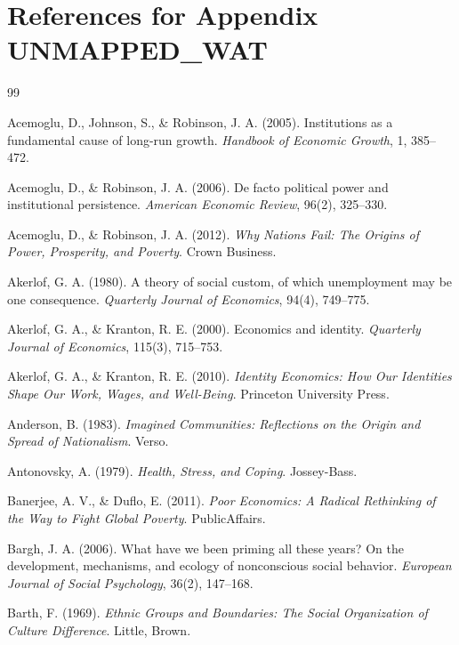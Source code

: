 \section{References for Appendix UNMAPPED_WAT}
\label{sec:app-c-references}

\begin{thebibliography}{99}

Acemoglu, D., Johnson, S., \& Robinson, J. A. (2005).
Institutions as a fundamental cause of long-run growth.
\textit{Handbook of Economic Growth}, 1, 385--472.

Acemoglu, D., \& Robinson, J. A. (2006).
De facto political power and institutional persistence.
\textit{American Economic Review}, 96(2), 325--330.

Acemoglu, D., \& Robinson, J. A. (2012).
\textit{Why Nations Fail: The Origins of Power, Prosperity, and Poverty}.
Crown Business.

Akerlof, G. A. (1980).
A theory of social custom, of which unemployment may be one consequence.
\textit{Quarterly Journal of Economics}, 94(4), 749--775.

Akerlof, G. A., \& Kranton, R. E. (2000).
Economics and identity.
\textit{Quarterly Journal of Economics}, 115(3), 715--753.

Akerlof, G. A., \& Kranton, R. E. (2010).
\textit{Identity Economics: How Our Identities Shape Our Work, Wages, and Well-Being}.
Princeton University Press.

Anderson, B. (1983).
\textit{Imagined Communities: Reflections on the Origin and Spread of Nationalism}.
Verso.

Antonovsky, A. (1979).
\textit{Health, Stress, and Coping}.
Jossey-Bass.

Banerjee, A. V., \& Duflo, E. (2011).
\textit{Poor Economics: A Radical Rethinking of the Way to Fight Global Poverty}.
PublicAffairs.

Bargh, J. A. (2006).
What have we been priming all these years? On the development, mechanisms, and ecology of nonconscious social behavior.
\textit{European Journal of Social Psychology}, 36(2), 147--168.

Barth, F. (1969).
\textit{Ethnic Groups and Boundaries: The Social Organization of Culture Difference}.
Little, Brown.


\end{thebibliography}
